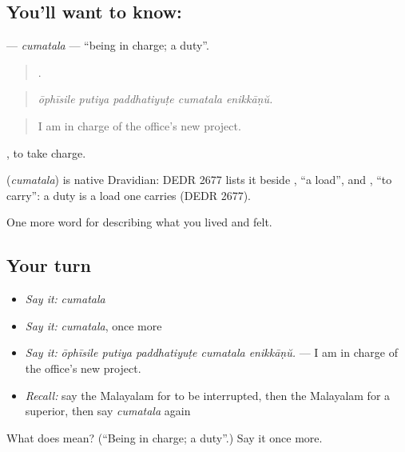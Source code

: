 \subsection*{You'll want to know: }
\textbf{} — \emph{cumatala} — \textquotedblleft{}being in charge; a duty\textquotedblright{}.

\begin{quote}
    .
\end{quote}

\begin{quote}
\emph{ōphīsile putiya paddhatiyuṭe cumatala enikkāṇŭ.}
\end{quote}

\begin{quote}
I am in charge of the office's new project.
\end{quote}

 , to take charge.

\begin{cousinweb}
\textbf{} (\emph{cumatala}) is native Dravidian: DEDR 2677 lists it beside , \textquotedblleft{}a load\textquotedblright{}, and , \textquotedblleft{}to carry\textquotedblright{}: a duty is a load one carries (DEDR 2677).
\end{cousinweb}

\begin{grammarlens}[title={What you've built}]
One more word for describing what you lived and felt.
\end{grammarlens}

\subsection*{Your turn}
\begin{itemize}
\raggedright
  \item \emph{Say it:} \emph{cumatala}
  \item \emph{Say it:} \emph{cumatala}, once more
  \item \emph{Say it:} \emph{ōphīsile putiya paddhatiyuṭe cumatala enikkāṇŭ.} — I am in charge of the office's new project.
  \item \emph{Recall:} say the Malayalam for to be interrupted, then the Malayalam for a superior, then say \emph{cumatala} again
\end{itemize}

\begin{tcolorbox}[breakable,colback=teal!4,colframe=teal!35!black,title={Before you move on}]
What does  mean? (\textquotedblleft{}Being in charge; a duty\textquotedblright{}.) Say it once more.
\end{tcolorbox}
